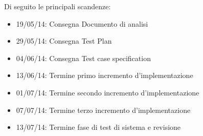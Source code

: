 Di seguito le principali scandenze:
\begin{itemize}
\item 19/05/14: Consegna Documento di analisi
\item 29/05/14: Consegna Test Plan
\item 04/06/14: Consegna Test case specification
\item 13/06/14: Termine primo incremento d'implementazione
\item 01/07/14: Termine secondo incremento d'implementazione
\item 07/07/14: Termine terzo incremento d'implementazione
\item 13/07/14: Termine fase di test di sistema e revisione
\end{itemize}
